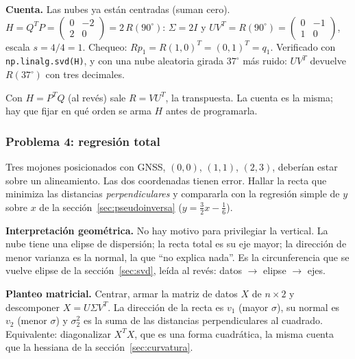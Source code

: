 \textbf{Cuenta.} Las nubes ya están centradas (suman cero).
\(H=Q^TP=\begin{pmatrix}0&-2\\2&0\end{pmatrix}=2\,R(90^\circ)\): \(\Sigma=2I\) y
\(UV^T=R(90^\circ)=\begin{pmatrix}0&-1\\1&0\end{pmatrix}\), escala
\(s=4/4=1\). Chequeo: \(Rp_1=R(1,0)^T=(0,1)^T=q_1\). Verificado con
\texttt{np.linalg.svd(H)}, y con una nube aleatoria girada \(37^\circ\) más ruido:
\(UV^T\) devuelve \(R(37^\circ)\) con tres decimales.

\begin{atencion}[Convención de \(H\)]
Con \(H=P^TQ\) (al revés) sale \(R=VU^T\), la transpuesta. La cuenta es la misma; hay
que fijar en qué orden se arma \(H\) antes de programarla.
\end{atencion}

\subsubsection{Problema 4: regresión total}

\begin{enunciado}[Enunciado]
Tres mojones posicionados con GNSS, \((0,0)\), \((1,1)\), \((2,3)\), deberían estar sobre
un alineamiento. Las dos coordenadas tienen error. Hallar la recta que minimiza las
distancias \emph{perpendiculares} y compararla con la regresión simple de \(y\) sobre
\(x\) de la sección~\ref{sec:pseudoinversa} (\(y=\tfrac32x-\tfrac16\)).
\end{enunciado}

\textbf{Interpretación geométrica.} No hay motivo para privilegiar la vertical. La nube
tiene una elipse de dispersión; la recta total es su eje mayor; la dirección de menor
varianza es la normal, la que ``no explica nada''. Es la circunferencia que se vuelve
elipse de la sección~\ref{sec:svd}, leída al revés: datos \(\to\) elipse \(\to\) ejes.

\textbf{Planteo matricial.} Centrar, armar la matriz de datos \(X\) de \(n\times2\) y
descomponer \(X=U\Sigma V^T\). La dirección de la recta es \(v_1\) (mayor \(\sigma\)), su
normal es \(v_2\) (menor \(\sigma\)) y \(\sigma_2^2\) es la suma de las distancias
perpendiculares al cuadrado. Equivalente: diagonalizar \(X^TX\), que es una forma
cuadrática, la misma cuenta que la hessiana de la sección~\ref{sec:curvatura}.

